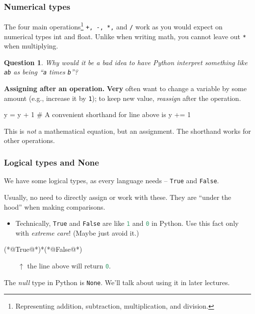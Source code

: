 \documentclass{beamer}
\newenvironment{codeblock}
    {\hfill\begin{beamerboxesrounded}[lower=codecol, width=0.8\textwidth]
    \medskip

    }
    { 
    \end{beamerboxesrounded}\hfill
    }
\theoremstyle{example}
\newtheorem{question}{Question}
\newcommand{\ct}[1]{\lstinline[language=Python]!#1!}
\newcommand{\ttt}[1]{{\small\texttt{#1}}}
\begin{document}
\begin{frame}[fragile]
\frametitle{Numerical types}

The four main operations\footnote{Representing addition, subtraction, multiplication, and division.} \ttt{+, -, *,} and \ttt{/} work as you would expect on numerical types {\ttb int} and {\ttb float}. Unlike when writing math, you cannot leave out \ttt{*} when multiplying.

\begin{question} Why would it be a \emph{bad} idea to have Python interpret something like \ttt{ab} as being ``\ttt{a} times \ttt{b}''?
\end{question}


{\bf \color{mygreen} Assigning after an operation.} {\bf Very} often want to change a variable by some amount (e.g., increase it by \ttt{1}); to keep new value, \emph{reassign} after the operation.

\begin{codeblock}

\begin{python}
y = y + 1
# A convenient shorthand for line above is
y += 1
\end{python}

\end{codeblock}

This is \emph{not} a mathematical equation, but an assignment. The shorthand works for other operations.
\end{frame}

\begin{frame}[fragile]
\frametitle{Logical types and {\ttm None}}

We have some logical types, as every language needs {--} \ttt{True} and \ttt{False}. 

Usually, no need to directly assign or work with these. They are ``under the hood'' when making comparisons. 
\begin{itemize}
	\item Technically, \ttt{True} and \ttt{False} are like \ct{1} and \ct{0} in Python. Use this fact only with \emph{extreme care}! (Maybe just avoid it.)
\end{itemize}
\begin{codeblock}

\begin{python}[numbers=none]
(*@\color{numeric}True@*)*(*@\color{numeric}False@*)
\end{python}

\end{codeblock}

$\qquad \uparrow$ the line above will return \ct{0}.
\vspace*{12pt}

The \emph{null} type in Python is \ttt{None}. We'll talk about using it in later lectures.
\end{frame}
\end{document}
